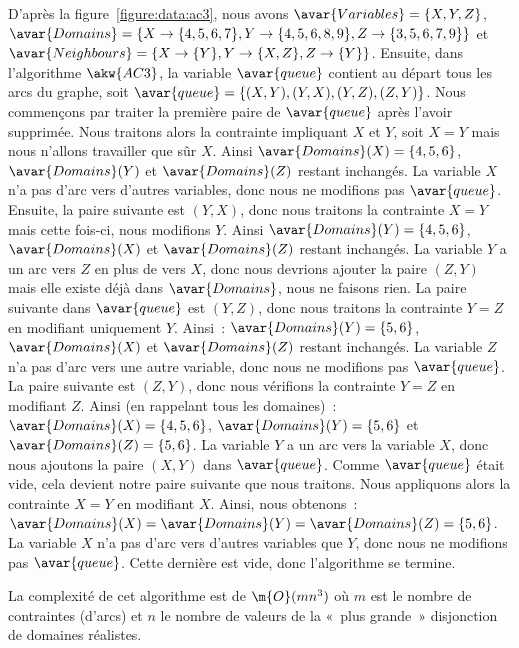 \begin{example}
D'après la figure~\ref{figure:data:ac3}, nous avons $\avar{Variables} = \{X, Y,
Z\}$, $\avar{Domains} = \{X \rightarrow \{4, 5, 6, 7\}, Y \rightarrow \{4, 5, 6,
8, 9\}, Z \rightarrow \{3, 5, 6, 7, 9\}\}$ et $\avar{Neighbours} = \{X
\rightarrow \{Y\}, Y \rightarrow \{X, Z\}, Z \rightarrow \{Y\}\}$. Ensuite, dans
l'algorithme $\akw{AC3}$, la variable $\avar{queue}$ contient au départ tous les
arcs du graphe, soit $\avar{queue} = \{(X, Y), (Y, X), (Y, Z), (Z, Y)\}$. Nous
commençons par traiter la première paire de $\avar{queue}$ après l'avoir
supprimée. Nous traitons alors la contrainte impliquant $X$ et $Y$, soit $X = Y$
mais nous n'allons travailler que sûr $X$.  Ainsi $\avar{Domains}(X) = \{4, 5,
6\}$, $\avar{Domains}(Y)$ et $\avar{Domains}(Z)$ restant inchangés. La variable
$X$ n'a pas d'arc vers d'autres variables, donc nous ne modifions pas
$\avar{queue}$.  Ensuite, la paire suivante est $(Y, X)$, donc nous traitons la
contrainte $X = Y$ mais cette fois-ci, nous modifions $Y$. Ainsi
$\avar{Domains}(Y) = \{4, 5, 6\}$, $\avar{Domains}(X)$ et $\avar{Domains}(Z)$
restant inchangés.  La variable $Y$ a un arc vers $Z$ en plus de vers $X$, donc
nous devrions ajouter la paire $(Z, Y)$ mais elle existe déjà dans
$\avar{Domains}$, nous ne faisons rien.  La paire suivante dans $\avar{queue}$
est $(Y, Z)$, donc nous traitons la contrainte $Y = Z$ en modifiant uniquement
$Y$. Ainsi~: $\avar{Domains}(Y) = \{5, 6\}$, $\avar{Domains}(X)$ et
$\avar{Domains}(Z)$ restant inchangés. La variable $Z$ n'a pas d'arc vers une
autre variable, donc nous ne modifions pas $\avar{queue}$. La paire suivante est
$(Z, Y)$, donc nous vérifions la contrainte $Y = Z$ en modifiant $Z$. Ainsi (en
rappelant tous les domaines)~: $\avar{Domains}(X) = \{4, 5, 6\}$,
$\avar{Domains}(Y) = \{5, 6\}$ et $\avar{Domains}(Z) = \{5, 6\}$. La variable
$Y$ a un arc vers la variable $X$, donc nous ajoutons la paire $(X, Y)$ dans
$\avar{queue}$.  Comme $\avar{queue}$ était vide, cela devient notre paire
suivante que nous traitons. Nous appliquons alors la contrainte $X = Y$ en
modifiant $X$.  Ainsi, nous obtenons~: $\avar{Domains}(X) = \avar{Domains}(Y) =
\avar{Domains}(Z) = \{5, 6\}$. La variable $X$ n'a pas d'arc vers d'autres
variables que $Y$, donc nous ne modifions pas $\avar{queue}$. Cette dernière est
vide, donc l'algorithme se termine.

\end{example}

La complexité de cet algorithme est de $\m{O}(mn^3)$ où $m$ est le nombre de
contraintes (d'arcs) et $n$ le nombre de valeurs de la «~plus grande~»
disjonction de domaines réalistes.

